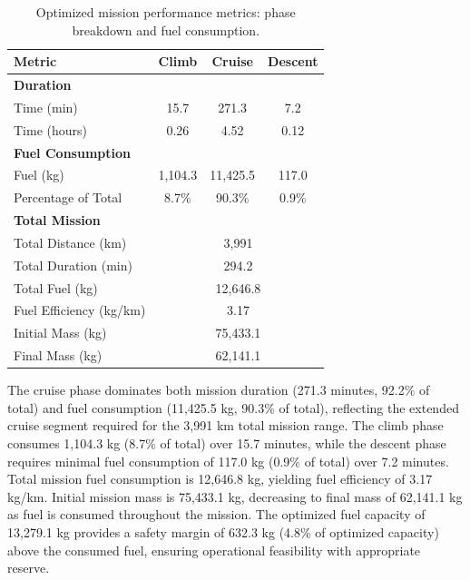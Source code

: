 \begin{table}[h]
    \centering
    \footnotesize
    \caption{Optimized mission performance metrics: phase breakdown and fuel consumption.}
    \label{tab:fuel_optimization_mission_metrics}
    \begin{tabular}{l c c c}
        \hline
        Metric & Climb & Cruise & Descent \\
        \hline
        \textbf{Duration} & & & \\
        Time (min) & 15.7 & 271.3 & 7.2 \\
        Time (hours) & 0.26 & 4.52 & 0.12 \\
        \hline
        \textbf{Fuel Consumption} & & & \\
        Fuel (kg) & 1{,}104.3 & 11{,}425.5 & 117.0 \\
        Percentage of Total & 8.7\% & 90.3\% & 0.9\% \\
        \hline
        \textbf{Total Mission} & & & \\
        Total Distance (km) & \multicolumn{3}{c}{3{,}991} \\
        Total Duration (min) & \multicolumn{3}{c}{294.2} \\
        Total Fuel (kg) & \multicolumn{3}{c}{12{,}646.8} \\
        Fuel Efficiency (kg/km) & \multicolumn{3}{c}{3.17} \\
        Initial Mass (kg) & \multicolumn{3}{c}{75{,}433.1} \\
        Final Mass (kg) & \multicolumn{3}{c}{62{,}141.1} \\
        \hline
    \end{tabular}
\end{table}

The cruise phase dominates both mission duration (271.3 minutes, 92.2\% of total) and fuel consumption (11,425.5 kg, 90.3\% of total), reflecting the extended cruise segment required for the 3,991 km total mission range. The climb phase consumes 1,104.3 kg (8.7\% of total) over 15.7 minutes, while the descent phase requires minimal fuel consumption of 117.0 kg (0.9\% of total) over 7.2 minutes. Total mission fuel consumption is 12,646.8 kg, yielding fuel efficiency of 3.17 kg/km. Initial mission mass is 75,433.1 kg, decreasing to final mass of 62,141.1 kg as fuel is consumed throughout the mission. The optimized fuel capacity of 13,279.1 kg provides a safety margin of 632.3 kg (4.8\% of optimized capacity) above the consumed fuel, ensuring operational feasibility with appropriate reserve.

